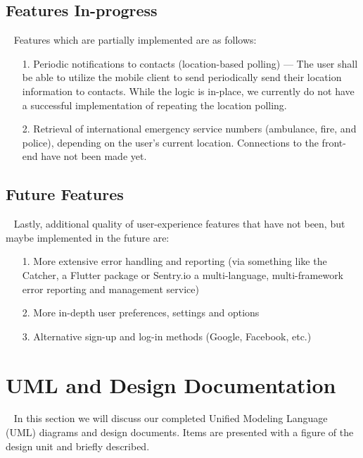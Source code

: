 \documentclass[10pt, a4paper]{article}
\begin{document}
\subsection{Features In-progress}
\par ~ Features which are partially implemented are as follows:
\begin{enumerate}
	\item[1.] Periodic notifications to contacts (location-based polling) --- The user shall be able to utilize the mobile client to send periodically send their location information to contacts. While the logic is in-place, we currently do not have a successful implementation of repeating the location polling.
	\item[2.] Retrieval of international emergency service numbers (ambulance, fire, and police), depending on the user's current location. Connections to the front-end have not been made yet. 
\end{enumerate}

\subsection{Future Features}
\par ~ Lastly, additional quality of user-experience features that have not been, but maybe implemented in the future are:
\begin{enumerate}
	\item[1.] More extensive error handling and reporting (via something like the Catcher, a Flutter package or Sentry.io a multi-language, multi-framework error reporting and management service)
	\item[2.] More in-depth user preferences, settings and options
	\item[3.] Alternative sign-up and log-in methods (Google, Facebook, etc.)
\end{enumerate}

\section{UML and Design Documentation}
\par ~ In this section we will discuss our completed Unified Modeling Language (UML) diagrams and design documents. Items are presented with a figure of the design unit and briefly described.
\end{document}
